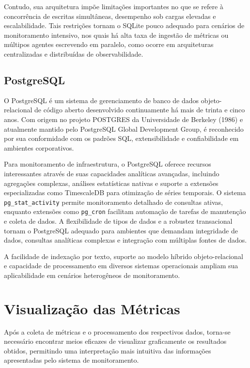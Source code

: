 Contudo, sua arquitetura impõe limitações importantes no que se refere à concorrência de escritas simultâneas, desempenho sob cargas elevadas e escalabilidade. Tais restrições tornam o SQLite pouco adequado para cenários de monitoramento intensivo, nos quais há alta taxa de ingestão de métricas ou múltipos agentes escrevendo em paralelo, como ocorre em arquiteturas centralizadas e distribuídas de observabilidade.

\subsection{PostgreSQL}
\label{subsection:PostgreSQL}

O PostgreSQL \citep{postgresql2025} é um sistema de gerenciamento de banco de dados objeto-relacional de código aberto desenvolvido continuamente há mais de trinta e cinco anos. Com origem no projeto POSTGRES da Universidade de Berkeley (1986) e atualmente mantido pelo PostgreSQL Global Development Group, é reconhecido por sua conformidade com os padrões SQL, extensibilidade e confiabilidade em ambientes corporativos.

Para monitoramento de infraestrutura, o PostgreSQL oferece recursos interessantes através de suas capacidades analíticas avançadas, incluindo agregações complexas, análises estatísticas nativas e suporte a extensões especializadas como TimescaleDB \citep{timescaledb2025} para otimização de séries temporais. O sistema \verb|pg_stat_activity| permite monitoramento detalhado de consultas ativas, enquanto extensões como \verb|pg_cron| facilitam automação de tarefas de manutenção e coleta de dados. A flexibilidade de tipos de dados e a robustez transacional tornam o PostgreSQL adequado para ambientes que demandam integridade de dados, consultas analíticas complexas e integração com múltiplas fontes de dados.

A facilidade de indexação por texto, suporte ao modelo híbrido objeto-relacional e capacidade de processamento em diversos sistemas operacionais ampliam sua aplicabilidade em cenários heterogêneos de monitoramento.

\section{Visualização das Métricas}
\label{section:VisualizacaoMetricas}

Após a coleta de métricas e o processamento dos respectivos dados, torna-se necessário encontrar meios eficazes de visualizar graficamente os resultados obtidos, permitindo uma interpretação mais intuitiva das informações apresentadas pelo sistema de monitoramento.

